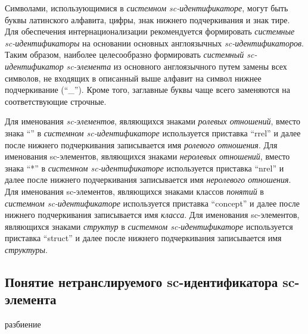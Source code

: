 Символами, использующимися в \textit{системном sc-идентификаторе}, могут быть буквы латинского алфавита, цифры, знак нижнего подчеркивания и знак тире. Для обеспечения интернационализации рекомендуется формировать \textit{системные sc-идентификаторы} на основании основных англоязычных \textit{sc-идентификаторов}. Таким образом, наиболее целесообразно формировать \textit{системный sc-идентификатор} \textit{sc-элемента} из основного англоязычного путем замены всех символов, не входящих в описанный выше алфавит на символ нижнее подчеркивание (``\_''). Кроме того, заглавные буквы чаще всего заменяются на соответствующие строчные.

Для именования \textit{sc-элементов}, являющихся знаками \textit{ролевых отношений}, вместо знака ``\scnrolesign'' в \textit{системном sc-идентификаторе} используется приставка ``rrel'' и далее после нижнего подчеркивания записывается имя \textit{ролевого отношения}. Для именования sc-элементов, являющихся знаками \textit{неролевых отношений}, вместо знака ``*'' в \textit{системном sc-идентификаторе} используется приставка ``nrel'' и далее после нижнего подчеркивания записывается имя \textit{неролевого отношения}. Для именования sc-элементов, являющихся знаками классов \textit{понятий} в \textit{системном sc-идентификаторе} используется приставка ``concept'' и далее после нижнего подчеркивания записывается имя \textit{класса}. Для именования sc-элементов, являющихся знаками \textit{структур} в \textit{системном sc-идентификаторе} используется приставка ``struct'' и далее после нижнего подчеркивания записывается имя \textit{структуры}.

\subsection{Понятие нетранслируемого sc-идентификатора sc-элемента}
\label{sec_non_translation_identifier_concept}

\begin{SCn}
	\begin{scnrelfromset}{разбиение}
	\end{scnrelfromset}
\end{SCn}

